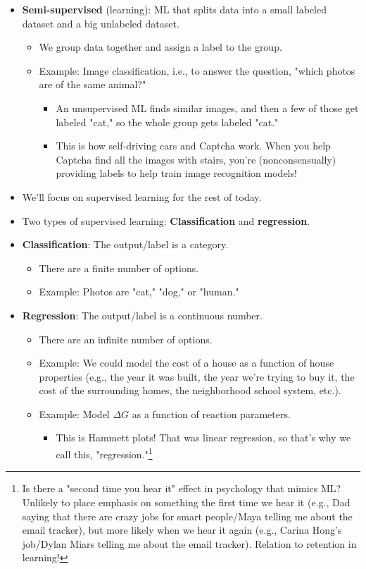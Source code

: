 \documentclass[../notes.tex]{subfiles}
\begin{document}
\begin{itemize}
    \item \textbf{Semi-supervised} (learning): ML that splits data into a small labeled dataset and a big unlabeled dataset.
    \begin{itemize}
        \item We group data together and assign a label to the group.
        \item Example: Image classification, i.e., to answer the question, "which photos are of the same animal?"
        \begin{itemize}
            \item An unsupervised ML finds similar images, and then a few of those get labeled "cat," so the whole group gets labeled "cat."
            \item This is how self-driving cars and Captcha work. When you help Captcha find all the images with stairs, you're (nonconsensually) providing labels to help train image recognition models!
        \end{itemize}
    \end{itemize}
    \item We'll focus on supervised learning for the rest of today.
    \item Two types of supervised learning: \textbf{Classification} and \textbf{regression}.
    \item \textbf{Classification}: The output/label is a category.
    \begin{itemize}
        \item There are a finite number of options.
        \item Example: Photos are "cat," "dog," or "human."
    \end{itemize}
    \item \textbf{Regression}: The output/label is a continuous number.
    \begin{itemize}
        \item There are an infinite number of options.
        \item Example: We could model the cost of a house as a function of house properties (e.g., the year it was built, the year we're trying to buy it, the cost of the surrounding homes, the neighborhood school system, etc.).
        \item Example: Model $\Delta G$ as a function of reaction parameters.
        \begin{itemize}
            \item This is Hammett plots! That was linear regression, so that's why we call this, "regression."\footnote{Is there a "second time you hear it" effect in psychology that mimics ML? Unlikely to place emphasis on something the first time we hear it (e.g., Dad saying that there are crazy jobs for smart people/Maya telling me about the email tracker), but more likely when we hear it again (e.g., Carina Hong's job/Dylan Miars telling me about the email tracker). Relation to retention in learning!}

\end{itemize}
\end{itemize}
\end{itemize}
\end{document}
